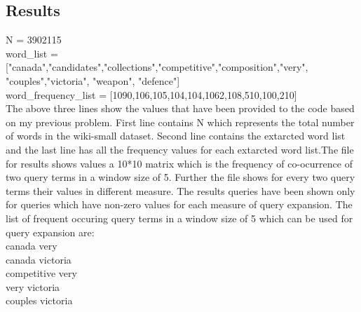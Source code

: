 \documentclass[12pt]{report}
\begin{document}
\subsection{Results}

N = 3902115\\
word\_list =["canada","candidates","collections","competitive","composition","very", "couples","victoria", "weapon", "defence"]\\
word\_frequency\_list = [1090,106,105,104,104,1062,108,510,100,210] \\

The above three lines show the values that have been provided to the code based on my previous problem. First line contains N which represents the total number of words in the wiki-small dataset. Second line contains the extarcted word list and the last line has all the frequency values for each extarcted word list.The file for results shows values a 10*10 matrix which is the frequency of co-ocurrence of two query terms in a window size of 5. Further the file shows for every two query terms their values in different measure. The results queries have been shown only for queries which have non-zero values for each measure of query expansion. The list of frequent occuring query terms in a window size of 5 which can be used for query expansion are:\\
canada very \\
canada victoria\\
competitive very\\
very victoria\\
couples victoria\\
 
\end{document}
